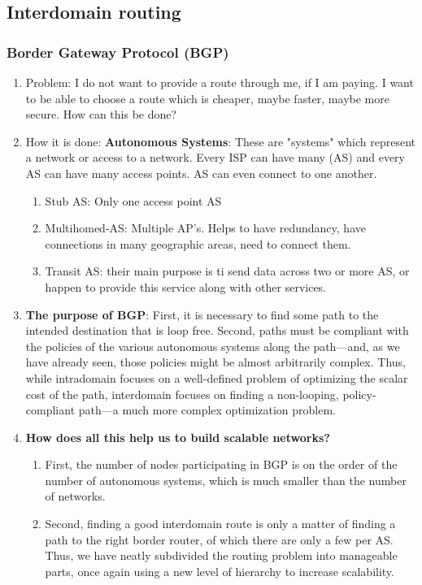 \documentclass[11pt, a4paper]{article}
\begin{document}
\subsection{Interdomain routing}
\subsubsection{Border Gateway Protocol (BGP)}
\begin{enumerate}
    \item Problem: I do not want to provide a route through me, if I am paying. I want to be able to choose a route which is cheaper, maybe faster, maybe more secure. How can this be done?
    \item How it is done:
    \textbf{Autonomous Systems}: These are "systems" which represent a network or access to a network. Every ISP can have many (AS) and every AS can have many access points. AS can even connect to one another.
    \begin{enumerate}
        \item Stub AS: Only one access point AS
        \item Multihomed-AS: Multiple AP's. Helps to have redundancy, have connections in many geographic areas, need to connect them.
        \item Transit AS: their main purpose is ti send data across two or more AS, or happen to provide this service along with other services.
    \end{enumerate}
    \item \textbf{The purpose of BGP}: First, it is necessary to find some path to the intended destination that is loop free. Second, paths must be compliant with the policies of the various autonomous systems along the path—and, as we have already seen, those policies might be almost arbitrarily complex. Thus, while intradomain focuses on a well-defined problem of optimizing the scalar cost of the path, interdomain focuses on finding a non-looping, policy-compliant path—a much more complex optimization problem.
    \item \textbf{How does all this help us to build scalable networks?}
    \begin{enumerate}
        \item First, the number of nodes participating in BGP is on the order of the number of autonomous systems, which is much smaller than the number of networks.
        \item Second, finding a good interdomain route is only a matter of finding a path to the right border router, of which there are only a few per AS. Thus, we have neatly subdivided the routing problem into manageable parts, once again using a new level of hierarchy to increase scalability.

\end{enumerate}
\end{enumerate}
\end{document}
